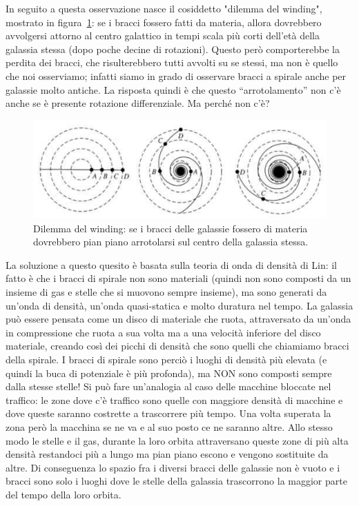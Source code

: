 In seguito a questa osservazione nasce il cosiddetto "dilemma del winding", mostrato in figura~\ref{fig:winding-dilemma}: se i bracci fossero fatti da materia, allora dovrebbero avvolgersi attorno al centro galattico in tempi scala più corti dell’età della galassia stessa (dopo poche decine di rotazioni). Questo però comporterebbe la perdita dei bracci, che risulterebbero tutti avvolti su se stessi, ma non è quello che noi osserviamo; infatti siamo in grado di osservare bracci a spirale anche per galassie molto antiche. La risposta quindi è che questo “arrotolamento” non c’è anche se è presente rotazione differenziale. Ma perché non c'è?

\begin{figure}
    \centering
    \includegraphics{immagini/winding-dilemma.jpg}
    \caption[width =\textwidth]{Dilemma del winding: se i bracci delle galassie fossero di materia dovrebbero pian piano arrotolarsi sul centro della galassia stessa.}
    \label{fig:winding-dilemma}
\end{figure}

La soluzione a questo quesito è basata sulla teoria di onda di densità di Lin: il fatto è che i bracci di spirale non sono materiali (quindi non sono composti da un insieme di gas e stelle che si muovono sempre insieme), ma sono generati da un’onda di densità, un’onda quasi-statica e molto duratura nel tempo. La galassia può essere pensata come un disco di materiale che ruota, attraversato da un’onda in compressione che ruota a sua volta ma a una velocità inferiore del disco materiale, creando così dei picchi di densità che sono quelli che chiamiamo bracci della spirale. I bracci di spirale sono perciò i luoghi di densità più elevata (e quindi la buca di potenziale è più profonda), ma NON sono composti sempre dalla stesse stelle! Si può fare un'analogia al caso delle macchine bloccate nel traffico: le zone dove c'è traffico sono quelle con maggiore densità di macchine e dove queste saranno costrette a trascorrere più tempo. Una volta superata la zona però la macchina se ne va e al suo posto ce ne saranno altre. Allo stesso modo le stelle e il gas, durante la loro orbita attraversano queste zone di più alta densità restandoci più a lungo ma pian piano escono e vengono sostituite da altre. Di conseguenza lo spazio fra i diversi bracci delle galassie non è vuoto e i bracci sono solo i luoghi dove le stelle della galassia trascorrono la maggior parte del tempo della loro orbita.

